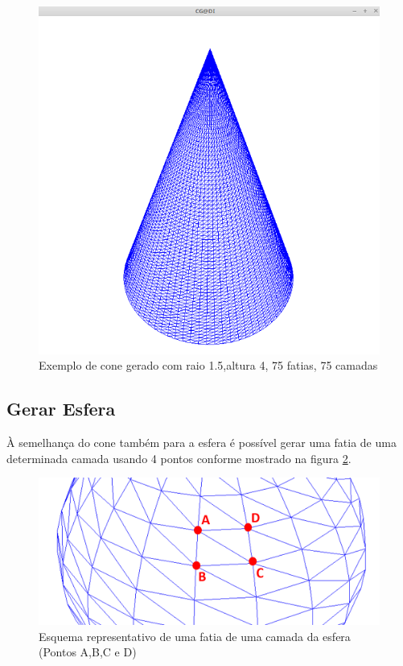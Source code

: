 \begin{figure}[<+htpb+>]
	\centering
	\includegraphics[scale=0.5]{imagens/print_cone_raio1-5_altura4_slices75_stacks75}
	\caption{Exemplo de cone gerado com raio 1.5,altura 4, 75 fatias, 75 camadas}
	\label{p1:fig:p3_cone_2_3_10_10}
\end{figure}


\newpage
\subsection{Gerar Esfera}

À semelhança do cone também para a esfera é possível gerar uma fatia de uma determinada camada usando 4 pontos conforme mostrado na figura \ref{p1:fig:p3_esferaSeccao_edit}.

\begin{figure}[<+htpb+>]
	\centering
	\includegraphics[scale=0.5]{imagens/p3_esferaSeccao_edit.png}
	\caption{Esquema representativo de uma fatia de uma camada da esfera (Pontos A,B,C e D)}
	\label{p1:fig:p3_esferaSeccao_edit}
\end{figure}


